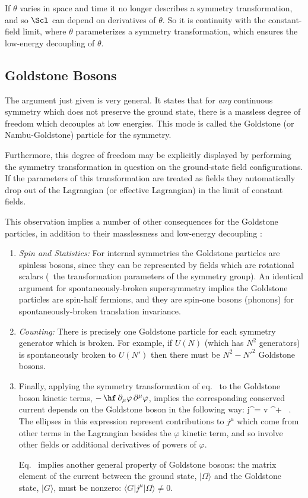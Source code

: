 If $\theta$ varies in space and time it no longer describes a
symmetry transformation, and so $\Scl$ can depend on 
derivatives of $\theta$. So it is continuity with the constant-field
limit, where $\theta$ parameterizes a symmetry transformation,
which ensures the low-energy decoupling of $\theta$.

\subsection{Goldstone Bosons}

The argument just given is very general. It states that for
{\sl any} continuous symmetry which does not preserve the
ground state, there is a massless degree of freedom which
decouples at low energies. This mode is called the Goldstone
(or Nambu-Goldstone) particle for the symmetry. 

Furthermore, this degree of
freedom may be explicitly displayed by performing the
symmetry transformation in question on the ground-state
field configurations. If the parameters of this transformation
are treated as fields they automatically drop out of the
Lagrangian (or effective Lagrangian) in the limit of constant
fields. 

This observation implies a number of other consequences
for the Goldstone particles, in addition to their masslessness
and low-energy decoupling \cite{Guralnik68,LeutwylerGB,Hofmann}:

\begin{enumerate}
\item
{\it Spin and Statistics:}
For internal symmetries the Goldstone particles are spinless bosons,
since they can be represented by fields which are rotational scalars
(\ie\ the transformation parameters of the symmetry group). An
identical argument for spontaneously-broken supersymmetry 
implies the Goldstone particles are spin-half fermions, and they
are spin-one bosons (phonons)
for spontaneously-broken translation invariance.
%
\item
{\it Counting:}
There is precisely one Goldstone particle for each symmetry
generator which is broken. For example, if $U(N)$ (which
has $N^2$ generators) is spontaneously broken to $U(N')$
then there must be $N^2 - {N'}^2$ Goldstone bosons. 
%
\item
Finally, applying the symmetry transformation of eq.~
to the Goldstone boson kinetic terms, $-\, \hf \, \partial_\mu \varphi
\, \partial^\mu \varphi$, implies the corresponding conserved
current depends on the Goldstone boson in the following way: 
%
\eq
\label{abelgbncex}
j^\mu =  \; v \; \partial^\mu \varphi + \cdots \, . 
\eeq
%
The ellipses in this expression represent contributions to $j^\mu$ which come
from other terms in the Lagrangian besides the $\varphi$ kinetic term,
and so involve other fields or additional derivatives of powers of
$\varphi$. 

Eq.~ implies another general property of Goldstone
bosons: the matrix element of the current between the ground state,
$|\Omega\rangle$ and the Goldstone state, $|G\rangle$, must
be nonzero: $\langle{G}| j^\mu | \Omega\rangle \neq 0$. 
\end{enumerate}

